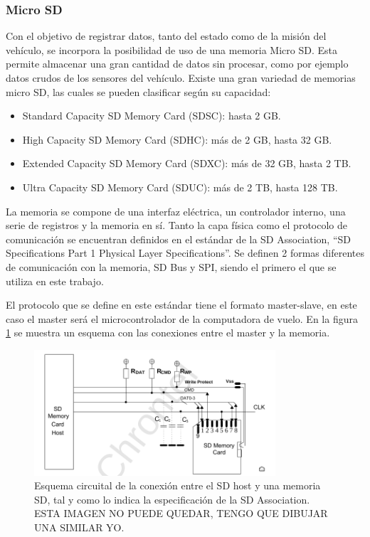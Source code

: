 \subsubsection{Micro SD}

Con el objetivo de registrar datos, tanto del estado como de la misión del vehículo, se incorpora la posibilidad de uso de una memoria Micro SD. Esta permite almacenar una gran cantidad de datos sin procesar, como por ejemplo datos crudos de los sensores del vehículo. Existe una gran variedad de memorias micro SD, las cuales se pueden clasificar según su capacidad:

\begin{itemize}
    \item Standard Capacity SD Memory Card (SDSC): hasta 2 GB.
    \item High Capacity SD Memory Card (SDHC): más de 2 GB, hasta 32 GB.
    \item Extended Capacity SD Memory Card (SDXC): más de 32 GB, hasta 2 TB.
    \item Ultra Capacity SD Memory Card (SDUC): más de 2 TB, hasta 128 TB.
\end{itemize}


La memoria se compone de una interfaz eléctrica, un controlador interno, una serie de registros y la memoria en sí. Tanto la capa física como el protocolo de comunicación se encuentran definidos en el estándar de la SD Association, ``SD Specifications Part 1 Physical Layer Specifications''. Se definen 2 formas diferentes de comunicación con la memoria, SD Bus y SPI, siendo el primero el que se utiliza en este trabajo.

El protocolo que se define en este estándar tiene el formato master-slave, en este caso el master será el microcontrolador de la computadora de vuelo. En la figura \ref{fig:SD_bus_conexiones} se muestra un esquema con las conexiones entre el master y la memoria.

\begin{figure}[H]
    \centering
    \includegraphics[width=0.8\textwidth]{img/SD_bus_conexiones.png}
    \caption{Esquema circuital de la conexión entre el SD host y una memoria SD, tal y como lo indica la especificación de la SD Association. {\color{red} ESTA IMAGEN NO PUEDE QUEDAR, TENGO QUE DIBUJAR UNA SIMILAR YO}.}
    \label{fig:SD_bus_conexiones}
\end{figure}

